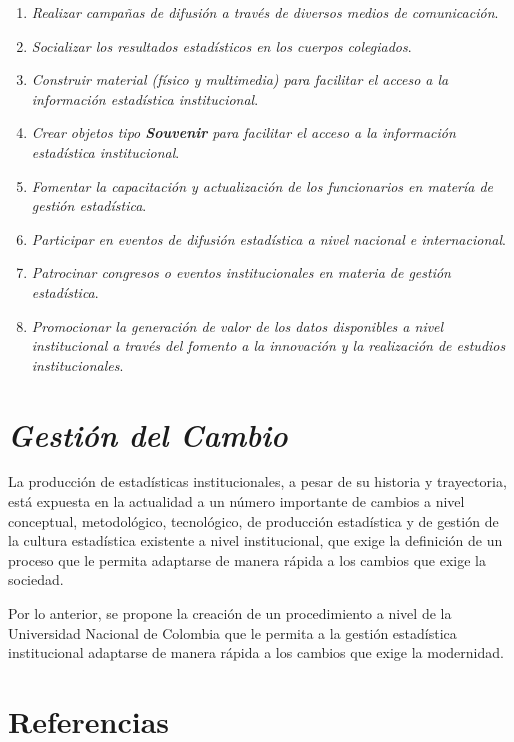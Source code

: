 \documentclass[
]{book}
\providecommand{\tightlist}{%
  \setlength{\itemsep}{0pt}\setlength{\parskip}{0pt}}
\begin{document}
\begin{enumerate}
\def\labelenumi{\arabic{enumi}.}
\tightlist
\item
  \emph{Realizar campañas de difusión a través de diversos medios de comunicación}.
\item
  \emph{Socializar los resultados estadísticos en los cuerpos colegiados}.
\item
  \emph{Construir material (físico y multimedia) para facilitar el acceso a la información estadística institucional}.
\item
  \emph{Crear objetos tipo \textbf{Souvenir} para facilitar el acceso a la información estadística institucional}.
\item
  \emph{Fomentar la capacitación y actualización de los funcionarios en matería de gestión estadística}.
\item
  \emph{Participar en eventos de difusión estadística a nivel nacional e internacional}.
\item
  \emph{Patrocinar congresos o eventos institucionales en materia de gestión estadística}.
\item
  \emph{Promocionar la generación de valor de los datos disponibles a nivel institucional a través del fomento a la innovación y la realización de estudios institucionales}.
\end{enumerate}

\hypertarget{gestiuxf3n-del-cambio}{%
\chapter{\texorpdfstring{\textbf{\emph{Gestión del Cambio}}}{Gestión del Cambio}}\label{gestiuxf3n-del-cambio}}

La producción de estadísticas institucionales, a pesar de su historia y trayectoria, está expuesta en la actualidad a un número importante de cambios a nivel conceptual, metodológico, tecnológico, de producción estadística y de gestión de la cultura estadística existente a nivel institucional, que exige la definición de un proceso que le permita adaptarse de manera rápida a los cambios que exige la sociedad.

Por lo anterior, se propone la creación de un procedimiento a nivel de la Universidad Nacional de Colombia que le permita a la gestión estadística institucional adaptarse de manera rápida a los cambios que exige la modernidad.

\hypertarget{referencias}{%
\chapter*{Referencias}\label{referencias}}

  
\end{document}
